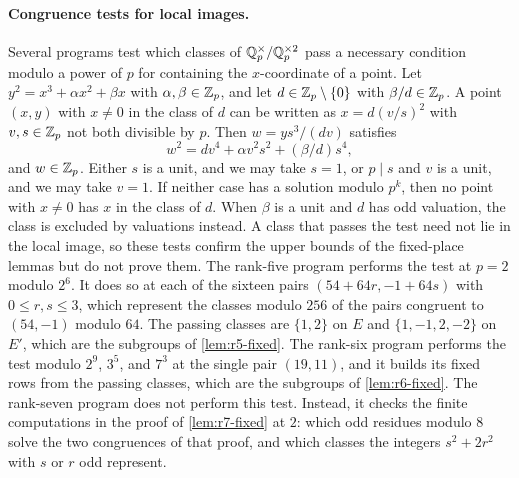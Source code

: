 \paragraph{Congruence tests for local images.} Several programs test which classes of $\mathbb Q_p^{\times}/\mathbb Q_p^{\times2}$ pass a necessary condition modulo a power of $p$ for containing the $x$-coordinate of a point. Let $y^2=x^3+\alpha x^2+\beta x$ with $\alpha,\beta\in\mathbb Z_p$, and let $d\in\mathbb Z_p\setminus\{0\}$ with $\beta/d\in\mathbb Z_p$. A point $(x,y)$ with $x\ne0$ in the class of $d$ can be written as $x=d(v/s)^2$ with $v,s\in\mathbb Z_p$ not both divisible by $p$. Then $w=ys^3/(dv)$ satisfies
\[
w^2=dv^4+\alpha v^2s^2+(\beta/d)s^4,
\]
and $w\in\mathbb Z_p$. Either $s$ is a unit, and we may take $s=1$, or $p\mid s$ and $v$ is a unit, and we may take $v=1$. If neither case has a solution modulo $p^k$, then no point with $x\ne0$ has $x$ in the class of $d$. When $\beta$ is a unit and $d$ has odd valuation, the class is excluded by valuations instead. A class that passes the test need not lie in the local image, so these tests confirm the upper bounds of the fixed-place lemmas but do not prove them. The rank-five program performs the test at $p=2$ modulo $2^6$. It does so at each of the sixteen pairs $(54+64r,-1+64s)$ with $0\le r,s\le3$, which represent the classes modulo $256$ of the pairs congruent to $(54,-1)$ modulo $64$. The passing classes are $\{1,2\}$ on $E$ and $\{1,-1,2,-2\}$ on $E'$, which are the subgroups of \cref{lem:r5-fixed}. The rank-six program performs the test modulo $2^9$, $3^5$, and $7^3$ at the single pair $(19,11)$, and it builds its fixed rows from the passing classes, which are the subgroups of \cref{lem:r6-fixed}. The rank-seven program does not perform this test. Instead, it checks the finite computations in the proof of \cref{lem:r7-fixed} at $2$: which odd residues modulo $8$ solve the two congruences of that proof, and which classes the integers $s^2+2r^2$ with $s$ or $r$ odd represent.

